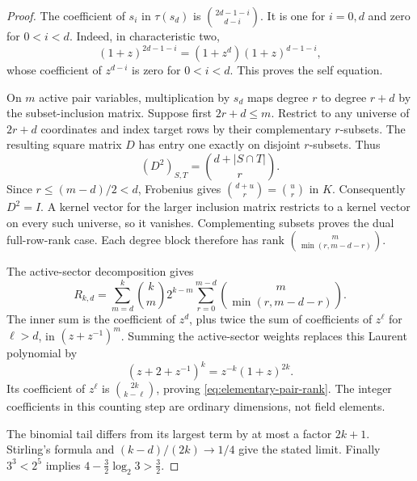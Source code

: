 \begin{proof}
The coefficient of \(s_i\) in \(\tau(s_d)\) is
\(\binom{2d-1-i}{d-i}\). It is one for \(i=0,d\) and zero for
\(0<i<d\). Indeed, in characteristic two,
\[
 (1+z)^{2d-1-i}=(1+z^d)(1+z)^{d-1-i},
\]
whose coefficient of \(z^{d-i}\) is zero for \(0<i<d\).
This proves the self equation.

On \(m\) active pair variables, multiplication by \(s_d\) maps
degree \(r\) to degree \(r+d\) by the subset-inclusion matrix.
Suppose first \(2r+d\leq m\). Restrict to any universe of
\(2r+d\) coordinates and index target rows by their complementary
\(r\)-subsets. The resulting square matrix \(D\) has entry one
exactly on disjoint \(r\)-subsets. Thus
\[
 (D^2)_{S,T}=\binom{d+|S\cap T|}{r}.
\]
Since \(r\leq(m-d)/2<d\), Frobenius gives
\(\binom{d+u}{r}=\binom ur\) in \(K\). Consequently \(D^2=I\).
A kernel vector for the larger inclusion matrix restricts to a
kernel vector on every such universe, so it vanishes.
Complementing subsets proves the dual full-row-rank case.
Each degree block therefore has rank
\(\binom m{\min(r,m-d-r)}\).

The active-sector decomposition gives
\[
 R_{k,d}=\sum_{m=d}^k\binom km2^{k-m}
       \sum_{r=0}^{m-d}\binom m{\min(r,m-d-r)}.
\]
The inner sum is the coefficient of \(z^d\), plus twice the sum
of coefficients of \(z^\ell\) for \(\ell>d\), in
\((z+z^{-1})^m\). Summing the active-sector weights replaces this
Laurent polynomial by
\[
 (z+2+z^{-1})^k=z^{-k}(1+z)^{2k}.
\]
Its coefficient of \(z^\ell\) is \(\binom{2k}{k-\ell}\),
proving \eqref{eq:elementary-pair-rank}. The integer coefficients
in this counting step are ordinary dimensions, not field elements.

The binomial tail differs from its largest term by at most a factor
\(2k+1\). Stirling's formula and
\((k-d)/(2k)\to1/4\) give the stated limit.
Finally \(3^3<2^5\) implies
\(4-\frac32\log_2 3>\frac32\).
\end{proof}


